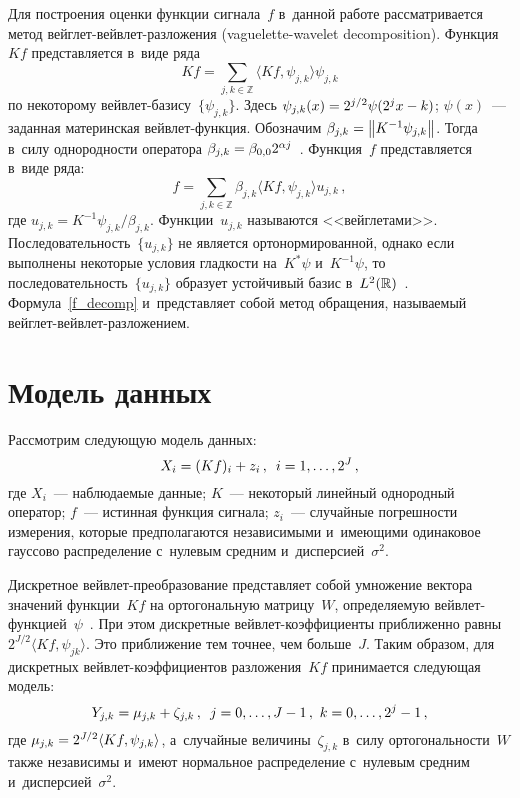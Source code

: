 \begin{multicols}{2}
Для построения оценки функции сигнала~$f$ в~данной работе рас\-смат\-ри\-ва\-ет\-ся метод 
вейг\-лет-вейв\-лет-раз\-ло\-же\-ния (vaguelette-wavelet decomposition). Функция~$Kf$ 
пред\-став\-ля\-ет\-ся в~виде ряда
\begin{equation*}
Kf=\sum\limits_{j,k\in {\mathbb {Z}}}\langle Kf,\psi_{j,k}\rangle\psi_{j,k} 
\end{equation*}
по некоторому вейвлет-ба\-зи\-су~$\{\psi_{j,k}\}$. 
Здесь $\psi_{j,k}(x)\hm=2^{j/2}\psi(2^jx-k)$; $\psi(x)$~--- 
заданная материнская вейв\-лет-функ\-ция. Обозначим $\beta_{j,k}\hm=
\norm{K^{-1}\psijk}$. Тогда
в~силу од\-но\-род\-ности оператора $\beta_{j,k}\hm=\beta_{0,0}2^{\alpha j}$~\cite{Abr98}. 
Функция~$f$ пред\-став\-ля\-ет\-ся в~виде ряда:
\begin{equation}
\label{f_decomp}
f=\sum\limits_{j,k\in {\mathbb {Z}}}\beta_{j,k}\langle Kf,\psi_{j,k}\rangle u_{j,k}\,,
\end{equation}
где $u_{j,k}=K^{-1}\psi_{j,k}/\beta_{j,k}$. Функции~$u_{j,k}$ называются 
<<вейглетами>>. По\-сле\-до\-ва\-тель\-ность~$\{u_{j,k}\}$ не является ортонормированной,
однако если выполнены некоторые условия глад\-кости на~$K^*\psi$ и~$K^{-1}\psi$, 
то по\-сле\-до\-ва\-тель\-ность~$\{u_{j,k}\}$ образует
устойчивый базис в~$L^2(\mathbb{R})$~\cite{Lee97}. Формула~\eqref{f_decomp} 
и~пред\-став\-ля\-ет собой метод обращения, называемый вейг\-лет-вейв\-лет-раз\-ло\-же\-нием.

\section{Модель данных}

Рассмотрим следующую модель данных:
$$
X_i=(Kf)_i+z_i\,,\enskip i=1,\ldots,2^J\,,
$$
где $X_i$~--- наблюдаемые данные; $K$~--- некоторый линейный однородный оператор; 
$f$~--- истинная  функция сигнала; $z_i$~--- случайные по\-греш\-ности
измерения, которые предполагаются независимыми и~име\-ющи\-ми одинаковое гауссово
распределение с~нулевым средним и~дисперсией~$\sigma^2$.

Дискретное вейвлет-пре\-об\-ра\-зо\-ва\-ние пред\-став\-ля\-ет 
собой умножение вектора значений функции~$Kf$ на ортогональную матрицу~$W$, 
опре\-де\-ля\-емую вейв\-лет-функ\-ци\-ей~$\psi$~\cite{Mal99}. 
При этом дискретные вейв\-лет-ко\-эф\-фи\-ци\-ен\-ты 
приближенно рав\-ны~$2^{J/2}\langle Kf,\psi_{jk}\rangle$. Это приближение 
тем точнее, чем больше~$J$. Таким образом, для дискретных вейв\-лет-ко\-эф\-фи\-ци\-ен\-тов 
разложения~$Kf$ принимается сле\-ду\-ющая модель:
$$
Y_{j,k}=\mu_{j,k}+\zeta_{j,k}\,, \enskip j=0,\ldots,J-1\,,\ k=0,\ldots,2^j-1\,,
$$
где  $\mu_{j,k}=2^{J/2}\langle Kf,\psi_{j,k}\rangle$, а~случайные величины~$\zeta_{j,k}$ 
в~силу ор\-то\-го\-наль\-ности~$W$ также независимы и~име\-ют 
нормальное распределение с~нулевым средним и~дисперсией~$\sigma^2$.


\end{multicols}
